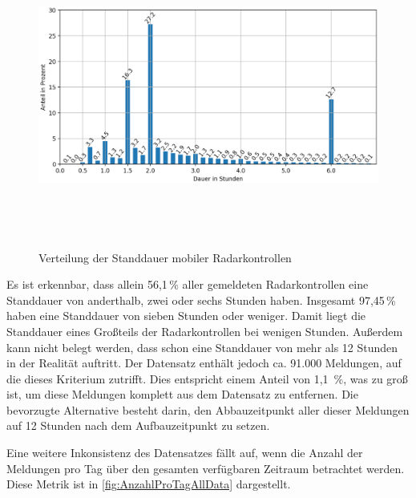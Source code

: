 \begin{figure}[h]
    \centering
    \includegraphics[width=1.0\textwidth,height=10cm,keepaspectratio=true]{content/images/Standdauer.png}
    \caption{Verteilung der Standdauer mobiler Radarkontrollen}
    \label{fig:StanddauerVerteilung}
\end{figure}

Es ist erkennbar, dass allein 56,1\,\% aller gemeldeten Radarkontrollen eine Standdauer von anderthalb, zwei oder sechs Stunden haben.
Insgesamt 97,45\,\% haben eine Standdauer von sieben Stunden oder weniger.
Damit liegt die Standdauer eines Großteils der Radarkontrollen bei wenigen Stunden.
Außerdem kann nicht belegt werden, dass schon eine Standdauer von mehr als 12 Stunden in der Realität auftritt.
Der Datensatz enthält jedoch ca. 91.000 Meldungen, auf die dieses Kriterium zutrifft.
Dies entspricht einem Anteil von 1,1 \,\%, was zu groß ist, um diese Meldungen komplett aus dem Datensatz zu entfernen.
Die bevorzugte Alternative besteht darin, den Abbauzeitpunkt aller dieser Meldungen auf 12 Stunden nach dem Aufbauzeitpunkt zu setzen.

Eine weitere Inkonsistenz des Datensatzes fällt auf, wenn die Anzahl der Meldungen pro Tag über den gesamten verfügbaren Zeitraum betrachtet werden.
Diese Metrik ist in \autoref{fig:AnzahlProTagAllData} dargestellt.

